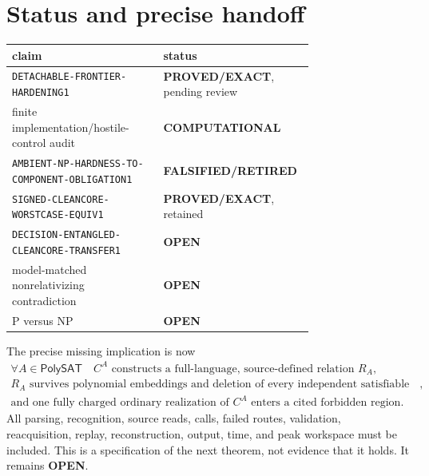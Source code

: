 \documentclass[11pt]{article}
\newcommand{\EXACT}{\textbf{PROVED/EXACT}}
\newcommand{\COMP}{\textbf{COMPUTATIONAL}}
\newcommand{\OPEN}{\textbf{OPEN}}
\newcommand{\RETIRED}{\textbf{FALSIFIED/RETIRED}}
\begin{document}
\section{Status and precise handoff}

\begin{center}\small
\begin{tabular}{p{0.47\linewidth}p{0.28\linewidth}}
\toprule
claim & status\\ \midrule
\texttt{DETACHABLE-FRONTIER-HARDENING1} & \EXACT, pending review\\
finite implementation/hostile-control audit & \COMP\\
\texttt{AMBIENT-NP-HARDNESS-TO-COMPONENT-OBLIGATION1} & \RETIRED\\
\texttt{SIGNED-CLEANCORE-WORSTCASE-EQUIV1} & \EXACT, retained\\
\texttt{DECISION-ENTANGLED-CLEANCORE-TRANSFER1} & \OPEN\\
model-matched nonrelativizing contradiction & \OPEN\\
P versus NP & \OPEN\\
\bottomrule
\end{tabular}
\end{center}

The precise missing implication is now
\[
\boxed{
\begin{gathered}
\forall A\in\mathsf{PolySAT}\quad
C^A\text{ constructs a full-language, source-defined relation }R_A,\\
R_A\text{ survives polynomial embeddings and deletion of every independent
satisfiable component},\\
\text{and one fully charged ordinary realization of }C^A
\text{ enters a cited forbidden region.}
\end{gathered}}
\]
All parsing, recognition, source reads, calls, failed routes, validation,
reacquisition, replay, reconstruction, output, time, and peak workspace must
be included.  This is a specification of the next theorem, not evidence that
it holds.  It remains \OPEN.
\end{document}
